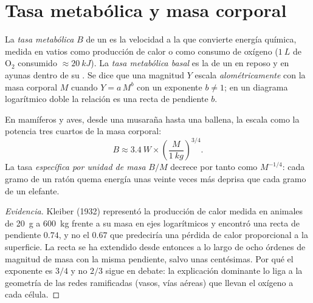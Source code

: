 \section{Tasa metabólica y masa corporal}

\begin{definition}\label{def:b1:organism-environment:allometry}
La \emph{tasa metabólica} $B$ de un  es la
velocidad a la que convierte energía química, medida en vatios como
producción de calor o como consumo de oxígeno ($\qty{1}{L}$ de
$\mathrm{O_2}$ consumido $\approx \qty{20}{kJ}$). La \emph{tasa metabólica
basal} es la de un  en reposo y en
ayunas dentro de su . Se dice que una magnitud
$Y$ escala \emph{alométricamente} con la masa corporal $M$
cuando $Y = a\,M^{b}$ con un exponente $b \neq 1$; en un diagrama
logarítmico doble la relación es una recta de pendiente $b$.
\end{definition}

\begin{theorem}\label{thm:b1:organism-environment:kleiber}
En mamíferos y aves, desde una musaraña hasta una ballena, la  escala como la potencia tres cuartos de la masa corporal:
\[
B \approx \qty{3.4}{W}\times\left(\frac{M}{\qty{1}{kg}}\right)^{3/4}.
\]
La tasa \emph{específica por unidad de masa} $B/M$ decrece por tanto como
$M^{-1/4}$: cada gramo de un ratón quema energía unas veinte veces más
deprisa que cada gramo de un elefante.
\end{theorem}
\begin{proof}[Evidencia]
Kleiber (1932) representó la producción de calor medida en animales de
\qty{20}{g} a \qty{600}{kg} frente a su masa en ejes logarítmicos y encontró
una recta de pendiente $0.74$, y no el $0.67$ que predeciría una pérdida de
calor proporcional a la superficie. La recta se ha extendido desde entonces
a lo largo de ocho órdenes de magnitud de masa con la misma pendiente, salvo
unas centésimas. Por qué el exponente es $3/4$ y no $2/3$ sigue en debate:
la explicación dominante lo liga a la geometría de las redes ramificadas
(vasos, vías aéreas) que llevan el oxígeno a cada célula.
\end{proof}

